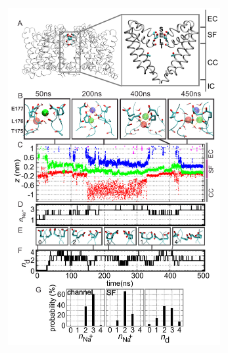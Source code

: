 \begin{refsection}
\begin{figure}[!ptb]
\centering
\includegraphics[width=0.5\textwidth]{nav1/Nav1Fig1}

\end{figure}
\end{refsection}
